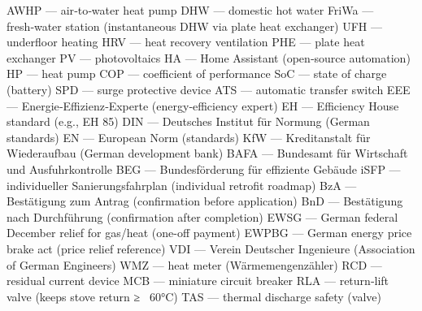 \markdownRendererDocumentBegin
\markdownRendererUlBeginTight
\markdownRendererUlItem AWHP — air‑to‑water heat pump\markdownRendererUlItemEnd 
\markdownRendererUlItem DHW — domestic hot water\markdownRendererUlItemEnd 
\markdownRendererUlItem FriWa — fresh‑water station (instantaneous DHW via plate heat exchanger)\markdownRendererUlItemEnd 
\markdownRendererUlItem UFH — underfloor heating\markdownRendererUlItemEnd 
\markdownRendererUlItem HRV — heat recovery ventilation\markdownRendererUlItemEnd 
\markdownRendererUlItem PHE — plate heat exchanger\markdownRendererUlItemEnd 
\markdownRendererUlItem PV — photovoltaics\markdownRendererUlItemEnd 
\markdownRendererUlItem HA — Home Assistant (open‑source automation)\markdownRendererUlItemEnd 
\markdownRendererUlItem HP — heat pump\markdownRendererUlItemEnd 
\markdownRendererUlItem COP — coefficient of performance\markdownRendererUlItemEnd 
\markdownRendererUlItem SoC — state of charge (battery)\markdownRendererUlItemEnd 
\markdownRendererUlItem SPD — surge protective device\markdownRendererUlItemEnd 
\markdownRendererUlItem ATS — automatic transfer switch\markdownRendererUlItemEnd 
\markdownRendererUlItem EEE — Energie‑Effizienz‑Experte (energy‑efficiency expert)\markdownRendererUlItemEnd 
\markdownRendererUlItem EH — Efficiency House standard (e.g., EH 85)\markdownRendererUlItemEnd 
\markdownRendererUlItem DIN — Deutsches Institut für Normung (German standards)\markdownRendererUlItemEnd 
\markdownRendererUlItem EN — European Norm (standards)\markdownRendererUlItemEnd 
\markdownRendererUlItem KfW — Kreditanstalt für Wiederaufbau (German development bank)\markdownRendererUlItemEnd 
\markdownRendererUlItem BAFA — Bundesamt für Wirtschaft und Ausfuhrkontrolle\markdownRendererUlItemEnd 
\markdownRendererUlItem BEG — Bundesförderung für effiziente Gebäude\markdownRendererUlItemEnd 
\markdownRendererUlItem iSFP — individueller Sanierungsfahrplan (individual retrofit roadmap)\markdownRendererUlItemEnd 
\markdownRendererUlItem BzA — Bestätigung zum Antrag (confirmation before application)\markdownRendererUlItemEnd 
\markdownRendererUlItem BnD — Bestätigung nach Durchführung (confirmation after completion)\markdownRendererUlItemEnd 
\markdownRendererUlItem EWSG — German federal December relief for gas/heat (one-off payment)\markdownRendererUlItemEnd 
\markdownRendererUlItem EWPBG — German energy price brake act (price relief reference)\markdownRendererUlItemEnd 
\markdownRendererUlItem VDI — Verein Deutscher Ingenieure (Association of German Engineers)\markdownRendererUlItemEnd 
\markdownRendererUlItem WMZ — heat meter (Wärmemengenzähler)\markdownRendererUlItemEnd 
\markdownRendererUlItem RCD — residual current device\markdownRendererUlItemEnd 
\markdownRendererUlItem MCB — miniature circuit breaker\markdownRendererUlItemEnd 
\markdownRendererUlItem RLA — return‑lift valve (keeps stove return ≥ ~60°C)\markdownRendererUlItemEnd 
\markdownRendererUlItem TAS — thermal discharge safety (valve)\markdownRendererUlItemEnd 
\markdownRendererUlEndTight \markdownRendererDocumentEnd